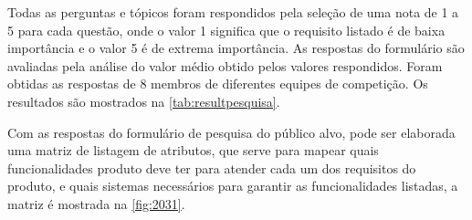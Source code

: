 Todas as perguntas e tópicos foram respondidos pela seleção de uma nota de 1 a 5 para cada questão, onde o valor 1 significa que o requisito listado é de baixa importância e
o valor 5 é de extrema importância. As respostas do formulário são avaliadas pela análise do valor médio obtido pelos valores respondidos. Foram obtidas as respostas de 8
membros de diferentes equipes de competição. Os resultados são mostrados na \autoref{tab:resultpesquisa}.

\begin{table}[!ht]
    \caption{Resultado pesquisa de mercado}
    \label{tab:resultpesquisa}
    \centering
\end{table}

Com as respostas do formulário de pesquisa do público alvo, pode ser elaborada uma matriz de listagem de atributos, que serve para mapear quais funcionalidades produto deve ter para atender cada um dos requisitos
do produto, e quais sistemas necessários para garantir as funcionalidades listadas, a matriz é mostrada na \autoref{fig:2031}.

